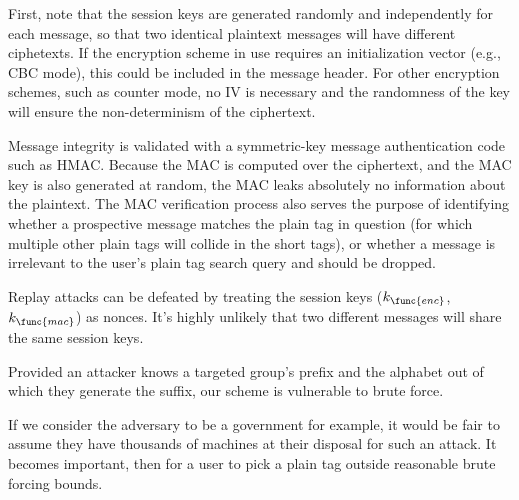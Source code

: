 First, note that the session keys are generated randomly and
independently for each message, so that two identical plaintext messages
will have different ciphetexts. If the encryption scheme in use requires
an initialization vector (e.g., CBC mode), this could be included in the
message header. For other encryption schemes, such as counter mode, no
IV is necessary and the randomness of the key will ensure the
non-determinism of the ciphertext.

Message integrity is validated with a symmetric-key message
authentication code such as HMAC. Because the MAC is computed over the
ciphertext, and the MAC key is also generated at random, the MAC leaks
absolutely no information about the plaintext. The MAC verification
process also serves the purpose of identifying whether a prospective
message matches the plain tag in question (for which multiple other
plain tags will collide in the short tags), or whether a message is
irrelevant to the user's plain tag search query and should be dropped.

Replay attacks can be defeated by treating the session keys
($k_{\func{enc}}$, $k_{\func{mac}}$) as nonces. It's highly unlikely
that two different messages will share the same session keys.


%
Provided an attacker knows a targeted group's prefix and the alphabet
out of which they generate the suffix, our scheme is vulnerable to brute
force.

If we consider the adversary to be a government for example, it would be fair to assume they have
thousands of machines at their disposal for such an attack. It becomes
important, then for a user to pick a plain tag outside reasonable brute
forcing bounds.


%


